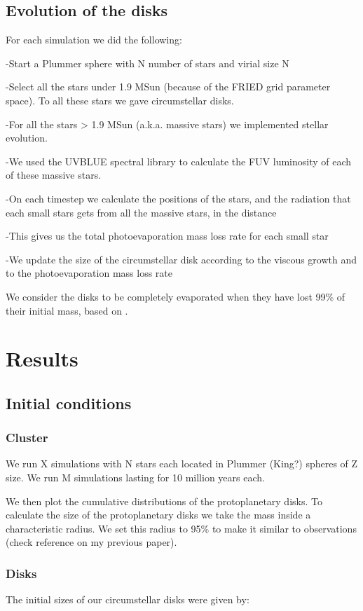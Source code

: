 \documentclass[fleqn,usenatbib]{mnras}
\begin{document}
\subsection{Evolution of the disks}
For each simulation we did the following:

-Start a Plummer sphere with N number of stars and virial size N

-Select all the stars under 1.9 MSun (because of the FRIED grid parameter space). To all these stars we gave circumstellar disks.

-For all the stars > 1.9 MSun (a.k.a. massive stars) we implemented stellar evolution.

-We used the UVBLUE spectral library to calculate the FUV luminosity of each of these massive stars.

-On each timestep we calculate the positions of the stars, and the radiation that each small stars gets from all the massive stars, in the distance

-This gives us the total photoevaporation mass loss rate for each small star

-We update the size of the circumstellar disk according to the viscous growth and to the photoevaporation mass loss rate


We consider the disks to be completely evaporated when they have lost 99\% of their initial mass, based on \citet{anderson2013}.

\section{Results}
\label{sec:results}

\subsection{Initial conditions}
\subsubsection{Cluster}
We run X simulations with N stars each located in Plummer (King?) spheres of Z size. We run M simulations lasting for 10 million years each. 

We then plot the cumulative distributions of the protoplanetary disks. To calculate the size of the protoplanetary disks we take the mass inside a characteristic radius. We set this radius to 95\% to make it similar to observations (check reference on my previous paper).

\subsubsection{Disks}\label{initdisks}
The initial sizes of our circumstellar disks were given by:
\end{document}
